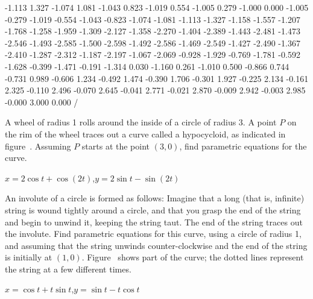 \begin{exercises}
\begin{exercise}
\begin{exercise}
\begin{exercise}
\begin{exercise}
\begin{exercise}
{-1.113 1.327 -1.074 1.081 -1.043 0.823 -1.019 0.554 -1.005 0.279
-1.000 0.000 -1.005 -0.279 -1.019 -0.554 -1.043 -0.823 -1.074 -1.081
-1.113 -1.327 -1.158 -1.557 -1.207 -1.768 -1.258 -1.959 -1.309 -2.127
-1.358 -2.270 -1.404 -2.389 -1.443 -2.481 -1.473 -2.546 -1.493 -2.585
-1.500 -2.598 -1.492 -2.586 -1.469 -2.549 -1.427 -2.490 -1.367 -2.410
-1.287 -2.312 -1.187 -2.197 -1.067 -2.069 -0.928 -1.929 -0.769 -1.781
-0.592 -1.628 -0.399 -1.471 -0.191 -1.314 0.030 -1.160 0.261 -1.010
0.500 -0.866 0.744 -0.731 0.989 -0.606 1.234 -0.492 1.474 -0.390
1.706 -0.301 1.927 -0.225 2.134 -0.161 2.325 -0.110 2.496 -0.070
2.645 -0.041 2.771 -0.021 2.870 -0.009 2.942 -0.003 2.985 -0.000
3.000 0.000 /
\textBlack
\endpicture}


\begin{exercise} A wheel of radius 1 rolls around the inside of 
a circle of radius 3. A point $P$ on the rim of the wheel traces out a
curve called a {\dfont hypocycloid}, as indicated in
figure~. Assuming $P$
starts at the point $(3,0)$, find parametric equations for the curve.
\begin{answer} $x=2\cos t+\cos(2t)$,\hfill\break $y=2\sin t-\sin(2t)$
\end{answer}\end{exercise}
\label{exer:hypocycloid}

\begin{exercise} An {\dfont involute} of a circle is formed
as follows: Imagine that a long (that is, infinite) string is wound tightly
around a circle, and that you grasp the end of the string and begin to
unwind it, keeping the string taut. The end of the string traces out
the involute. Find parametric equations for this curve, using a circle
of radius 1, and assuming that the string unwinds counter-clockwise
and the end of the string is initially at $(1,0)$. 
Figure~ shows part of the curve; the
dotted lines represent the string at a few different times.
\begin{answer} $x=\cos t+t\sin t$,\hfill\break  $y=\sin t-t\cos t$
\end{answer}\end{exercise}
\label{exer:involute of a circle}


\end{exercise}
\end{exercise}
\end{exercise}
\end{exercise}
\end{exercise}
\end{exercises}
